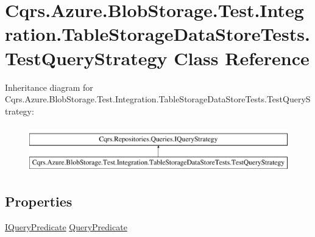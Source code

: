 \hypertarget{classCqrs_1_1Azure_1_1BlobStorage_1_1Test_1_1Integration_1_1TableStorageDataStoreTests_1_1TestQueryStrategy}{}\section{Cqrs.\+Azure.\+Blob\+Storage.\+Test.\+Integration.\+Table\+Storage\+Data\+Store\+Tests.\+Test\+Query\+Strategy Class Reference}
\label{classCqrs_1_1Azure_1_1BlobStorage_1_1Test_1_1Integration_1_1TableStorageDataStoreTests_1_1TestQueryStrategy}
Inheritance diagram for Cqrs.\+Azure.\+Blob\+Storage.\+Test.\+Integration.\+Table\+Storage\+Data\+Store\+Tests.\+Test\+Query\+Strategy\+:\begin{figure}[H]
\begin{center}
\leavevmode
\includegraphics[height=2.000000cm]{classCqrs_1_1Azure_1_1BlobStorage_1_1Test_1_1Integration_1_1TableStorageDataStoreTests_1_1TestQueryStrategy}
\end{center}
\end{figure}
\subsection*{Properties}
\begin{DoxyCompactItemize}
\item 
\hyperlink{interfaceCqrs_1_1Repositories_1_1Queries_1_1IQueryPredicate}{I\+Query\+Predicate} \hyperlink{classCqrs_1_1Azure_1_1BlobStorage_1_1Test_1_1Integration_1_1TableStorageDataStoreTests_1_1TestQueryStrategy_a737d64c44c933d9a0d8e3b4ad3aee715}{Query\+Predicate}
\end{DoxyCompactItemize}


